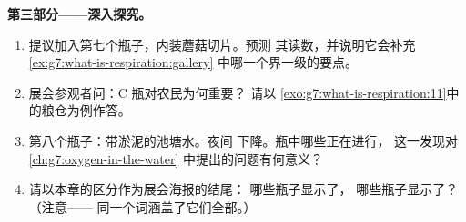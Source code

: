 \begin{problem}
\medskip\noindent\textbf{第三部分——深入探究。}
\begin{enumerate}[resume]
  \item 提议加入第七个瓶子，内装蘑菇切片。预测
        其读数，并说明它会补充
        \cref{ex:g7:what-is-respiration:gallery}
        中哪一个界一级的要点。
  \item 展会参观者问：C 瓶对农民为何重要？
        请以
        \cref{exo:g7:what-is-respiration:11}中的粮仓为例作答。
  \item 第八个瓶子：带淤泥的池塘水。夜间
        下降。瓶中哪些正在进行，
        这一发现对\cref{ch:g7:oxygen-in-the-water}
        中提出的问题有何意义？
  \item 请以本章的区分作为展会海报的结尾：
        哪些瓶子显示了\emph{}，
        哪些瓶子显示了\emph{}？（注意——
        同一个词涵盖了它们全部。）
\end{enumerate}
\end{problem}
